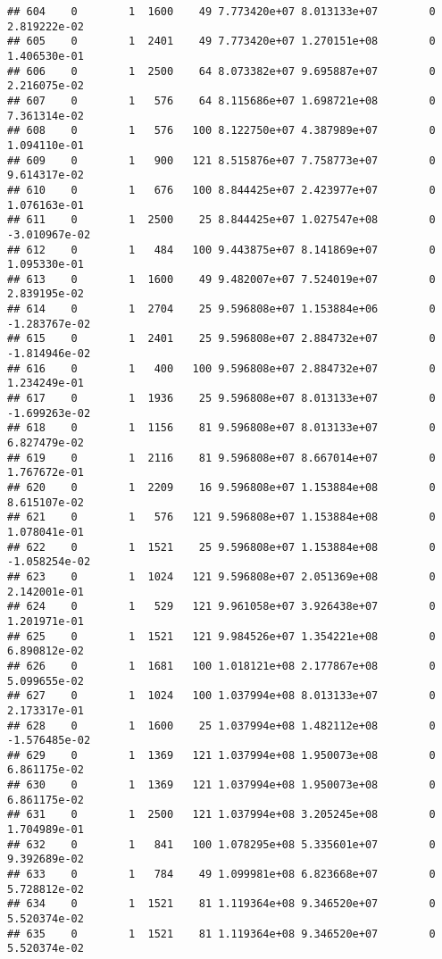 \documentclass[
]{article}
\begin{document}
\begin{enumerate}
\begin{verbatim}
## 604    0        1  1600    49 7.773420e+07 8.013133e+07        0  2.819222e-02
## 605    0        1  2401    49 7.773420e+07 1.270151e+08        0  1.406530e-01
## 606    0        1  2500    64 8.073382e+07 9.695887e+07        0  2.216075e-02
## 607    0        1   576    64 8.115686e+07 1.698721e+08        0  7.361314e-02
## 608    0        1   576   100 8.122750e+07 4.387989e+07        0  1.094110e-01
## 609    0        1   900   121 8.515876e+07 7.758773e+07        0  9.614317e-02
## 610    0        1   676   100 8.844425e+07 2.423977e+07        0  1.076163e-01
## 611    0        1  2500    25 8.844425e+07 1.027547e+08        0 -3.010967e-02
## 612    0        1   484   100 9.443875e+07 8.141869e+07        0  1.095330e-01
## 613    0        1  1600    49 9.482007e+07 7.524019e+07        0  2.839195e-02
## 614    0        1  2704    25 9.596808e+07 1.153884e+06        0 -1.283767e-02
## 615    0        1  2401    25 9.596808e+07 2.884732e+07        0 -1.814946e-02
## 616    0        1   400   100 9.596808e+07 2.884732e+07        0  1.234249e-01
## 617    0        1  1936    25 9.596808e+07 8.013133e+07        0 -1.699263e-02
## 618    0        1  1156    81 9.596808e+07 8.013133e+07        0  6.827479e-02
## 619    0        1  2116    81 9.596808e+07 8.667014e+07        0  1.767672e-01
## 620    0        1  2209    16 9.596808e+07 1.153884e+08        0  8.615107e-02
## 621    0        1   576   121 9.596808e+07 1.153884e+08        0  1.078041e-01
## 622    0        1  1521    25 9.596808e+07 1.153884e+08        0 -1.058254e-02
## 623    0        1  1024   121 9.596808e+07 2.051369e+08        0  2.142001e-01
## 624    0        1   529   121 9.961058e+07 3.926438e+07        0  1.201971e-01
## 625    0        1  1521   121 9.984526e+07 1.354221e+08        0  6.890812e-02
## 626    0        1  1681   100 1.018121e+08 2.177867e+08        0  5.099655e-02
## 627    0        1  1024   100 1.037994e+08 8.013133e+07        0  2.173317e-01
## 628    0        1  1600    25 1.037994e+08 1.482112e+08        0 -1.576485e-02
## 629    0        1  1369   121 1.037994e+08 1.950073e+08        0  6.861175e-02
## 630    0        1  1369   121 1.037994e+08 1.950073e+08        0  6.861175e-02
## 631    0        1  2500   121 1.037994e+08 3.205245e+08        0  1.704989e-01
## 632    0        1   841   100 1.078295e+08 5.335601e+07        0  9.392689e-02
## 633    0        1   784    49 1.099981e+08 6.823668e+07        0  5.728812e-02
## 634    0        1  1521    81 1.119364e+08 9.346520e+07        0  5.520374e-02
## 635    0        1  1521    81 1.119364e+08 9.346520e+07        0  5.520374e-02

\end{verbatim}
\end{enumerate}
\end{document}
